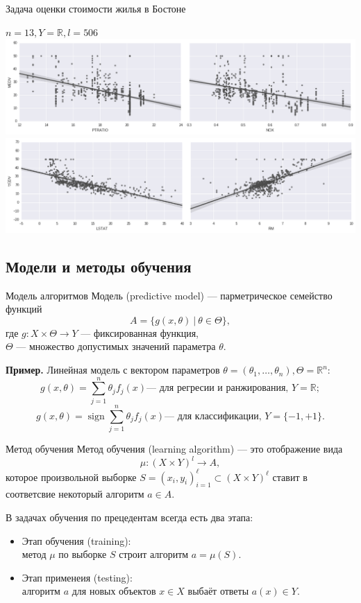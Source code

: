 \documentclass{beamer}
\DeclareMathOperator{\sign}{sign}
\begin{document}
\begin{frame}{Задача оценки стоимости жилья в Бостоне}
    \begin{center}
        $n = 13, Y= \mathbb{R}, l = 506$
        \includegraphics[width=\linewidth]{fig/boston1.png}
        \\
        \includegraphics[width=\linewidth]{fig/boston2.png}
    \end{center} 
\end{frame}

\subsection{Модели и методы обучения}
\begin{frame}{Модель алгоритмов}
Модель (predictive model) --- парметрическое семейство функций
$$
    A = \{g(x, \theta) ~|~ \theta \in \Theta\},
$$
где $g : X \times \Theta \rightarrow Y$ --- фиксированная функция,\\
$\Theta$ --- множество допустимых значений параметра $\theta$.

{\bf Пример.}
Линейная модель с вектором параметров $\theta = (\theta_1,\dots,\theta_n), \Theta = \mathbb{R}^n$:
$$
    g(x, \theta) = \sum\limits_{j=1}^{n}\theta_j f_j(x) \text{--- для регресии и ранжирования, $Y = \mathbb{R}$};
$$
$$
    g(x, \theta) = \sign\sum\limits_{j=1}^{n}\theta_j f_j(x) \text{--- для классификации, $Y = \{-1, +1\}$}.
$$
\end{frame}

\begin{frame}{Метод обучения}
Метод обучения (learning algorithm) --- это отображение вида
$$
\mu: (X \times Y)^l \rightarrow A,
$$
которое произвольной выборке $S = (x_i, y_i)_{i=1}^{\ell} \subset (X \times Y)^\ell$ ставит в соответсвие некоторый алгоритм $a \in A$.

В задачах обучения по прецедентам всегда есть два этапа:
\begin{itemize}
    \item Этап обучения (training): \\
    метод $\mu$ по выборке $S$ строит алгоритм $a = \mu(S)$.
    \item Этап применеия (testing): \\
    алгоритм $a$ для новых объектов $x \in X$ выбаёт ответы $a(x) \in Y$.

\end{itemize}
\end{frame}
\end{document}
